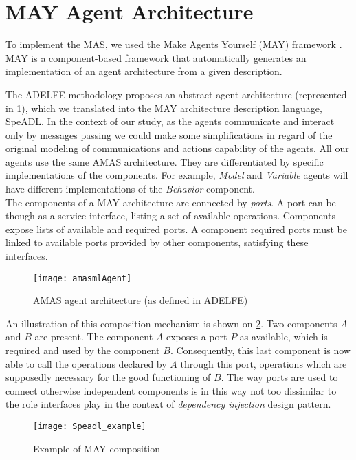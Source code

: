 \section{MAY Agent Architecture}

To implement the MAS, we used the Make Agents Yourself (MAY) framework \cite{No2012.2}. MAY is a component-based framework that automatically generates an implementation of an agent architecture from a given description.

The ADELFE methodology proposes an abstract agent architecture (represented in \figurename{} \ref{AMAS-ML_agent}), which we translated into the MAY architecture description language, SpeADL. In the context of our study, as the agents communicate and interact only by messages passing we could make some simplifications in regard of the original modeling of communications and actions capability of the agents. All our agents use the same AMAS architecture. They are differentiated by specific implementations of the components. For example, \emph{Model} and \emph{Variable} agents will have different implementations of the \emph{Behavior} component.\\
The components of a MAY architecture are connected by \emph{ports}. A port can be though as a service interface, listing a set of available operations. Components expose lists of available and required ports. A component required ports must be linked to available ports provided by other components, satisfying these interfaces.

\begin{figure}
\centering
\texttt{[image: amasmlAgent]}
\caption{AMAS agent architecture (as defined in ADELFE)}\label{AMAS-ML_agent}
\end{figure}

An illustration of this composition mechanism is shown on \figurename{} \ref{Speadl_example}. Two components $A$ and $B$ are present. The component $A$ exposes a port $P$ as available, which is required and used by the component $B$. Consequently, this last component is now able to call the operations declared by $A$ through this port, operations which are supposedly necessary for the good functioning of $B$. The way ports are used to connect otherwise independent components is in this way not too dissimilar to the role interfaces play in the context of \emph{dependency injection} design pattern.

\begin{figure}
\centering
\texttt{[image: Speadl\_example]}
\caption{Example of MAY composition}\label{Speadl_example}
\end{figure}

